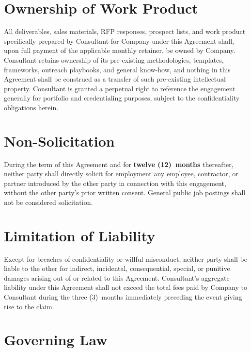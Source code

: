\documentclass{toospoint}
\begin{document}
\section{Ownership of Work Product}

All deliverables, sales materials, RFP responses, prospect lists, and work
product specifically prepared by Consultant for Company under this Agreement
shall, upon full payment of the applicable monthly retainer, be owned by
Company. Consultant retains ownership of its pre-existing methodologies,
templates, frameworks, outreach playbooks, and general know-how, and nothing
in this Agreement shall be construed as a transfer of such pre-existing
intellectual property. Consultant is granted a perpetual right to reference
the engagement generally for portfolio and credentialing purposes, subject to
the confidentiality obligations herein.

\section{Non-Solicitation}

During the term of this Agreement and for \textbf{twelve (12)~months}
thereafter, neither party shall directly solicit for employment any employee,
contractor, or partner introduced by the other party in connection with this
engagement, without the other party's prior written consent. General public
job postings shall not be considered solicitation.

\section{Limitation of Liability}

Except for breaches of confidentiality or willful misconduct, neither party
shall be liable to the other for indirect, incidental, consequential, special,
or punitive damages arising out of or related to this Agreement. Consultant's
aggregate liability under this Agreement shall not exceed the total fees paid
by Company to Consultant during the three (3)~months immediately preceding the
event giving rise to the claim.

\section{Governing Law}
\end{document}
